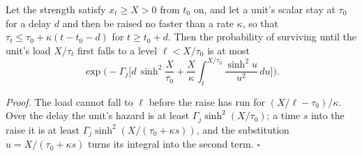 \begin{theorem}
\label{gr1:thm:upscaling}
Let the strength satisfy $x_t\ge X>0$ from $t_0$ on, and let a unit's
scalar stay at $\tau_0$ for a delay $d$ and then be raised no faster than a
rate $\kappa$, so that $\tau_t\le\tau_0+\kappa(t-t_0-d)$ for $t\ge t_0+d$.
Then the probability of surviving until the unit's load $X/\tau_t$ first
falls to a level $\ell<X/\tau_0$ is at most
\[
\exp\!\Big(-\Gamma_j\Big[d\,\sinh^2\!\frac{X}{\tau_0}+\frac{X}{\kappa}\int_\ell^{X/\tau_0}\frac{\sinh^2u}{u^2}\,du\Big]\Big).
\]
\end{theorem}

\noindent\emph{Proof.} The load cannot fall to $\ell$ before the raise has
run for $(X/\ell-\tau_0)/\kappa$. Over the delay the unit's hazard is at
least $\Gamma_j\sinh^2(X/\tau_0)$; a time $s$ into the raise it is at least
$\Gamma_j\sinh^2(X/(\tau_0+\kappa s))$, and the substitution
$u=X/(\tau_0+\kappa s)$ turns its integral into the second term. $\square$

